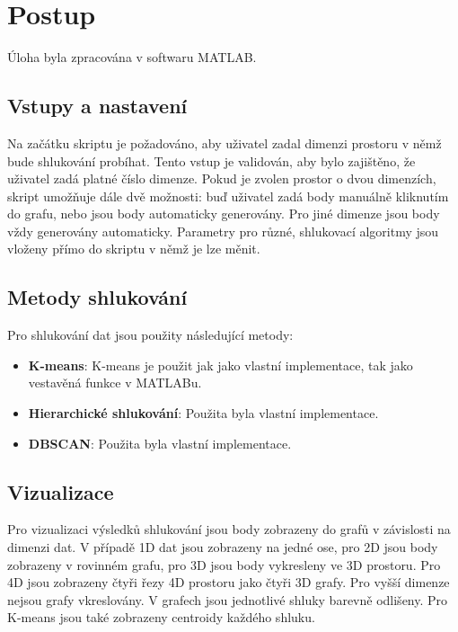 \newpage
\section{Postup}

Úloha byla zpracována v softwaru MATLAB.

\subsection{Vstupy a nastavení}
Na začátku skriptu je požadováno, aby uživatel zadal dimenzi prostoru v němž bude shlukování probíhat. Tento vstup je validován, aby bylo zajištěno, že uživatel zadá platné číslo dimenze. Pokud je zvolen prostor o dvou dimenzích, skript umožňuje dále dvě možnosti: buď uživatel zadá body manuálně kliknutím do grafu, nebo jsou body automaticky generovány. Pro jiné dimenze jsou body vždy generovány automaticky. Parametry pro různé, shlukovací algoritmy jsou vloženy přímo do skriptu v němž je lze měnit.

\subsection{Metody shlukování}
Pro shlukování dat jsou použity následující metody:

\begin{itemize}
    \item \textbf{K-means}: K-means je použit jak jako vlastní implementace, tak jako vestavěná funkce v MATLABu.
    \item \textbf{Hierarchické shlukování}: Použita byla vlastní implementace.
    \item \textbf{DBSCAN}: Použita byla vlastní implementace.
\end{itemize}

\subsection{Vizualizace}
Pro vizualizaci výsledků shlukování jsou body zobrazeny do grafů v závislosti na dimenzi dat. V případě 1D dat jsou zobrazeny na jedné ose, pro 2D jsou body zobrazeny v rovinném grafu, pro 3D jsou body vykresleny ve 3D prostoru. Pro 4D jsou zobrazeny čtyři řezy 4D prostoru jako čtyři 3D grafy. Pro vyšší dimenze nejsou grafy vkreslovány. V grafech jsou jednotlivé shluky barevně odlišeny. Pro K-means jsou také zobrazeny centroidy každého shluku.